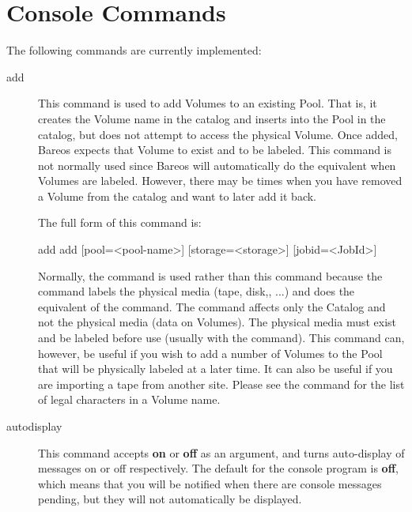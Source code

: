 \section{Console Commands}
    \label{sec:ConsoleCommands}

The following commands are currently implemented:

\begin{description}
\item [add]
   This command is used to add Volumes to an existing Pool.  That is,
   it creates the Volume name in the catalog and inserts into the Pool
   in the catalog, but does not attempt to access the physical Volume.
   Once added, Bareos expects that Volume to exist and to be labeled.
   This command is not normally used since Bareos will
   automatically do the equivalent when Volumes are labeled. However,
   there may be times when you have removed a Volume from the catalog
   and want to later add it back.

   The full form of this command is:

\begin{bconsole}{add}
add [pool=<pool-name>] [storage=<storage>] [jobid=<JobId>]
\end{bconsole}

   Normally, the  command is used rather than this command
   because the  command labels the physical media (tape, disk,, ...)
   and does the equivalent of the  command.
   The  command affects only the Catalog and not the physical media (data
   on Volumes).  The physical media must exist and be labeled before use
   (usually with the  command).  This command can, however, be
   useful if you wish to add a number of Volumes to the Pool that will be
   physically labeled at a later time.  It can also be useful if you are
   importing a tape from another site.  Please see the  command
   for the list of legal characters in a Volume name.

\item [autodisplay]
   This command accepts {\bf on} or {\bf off} as an argument, and turns
   auto-display of messages on or off respectively.  The default for the
   console program is {\bf off}, which means that you will be notified when
   there are console messages pending, but they will not automatically be
   displayed.


\end{description}
